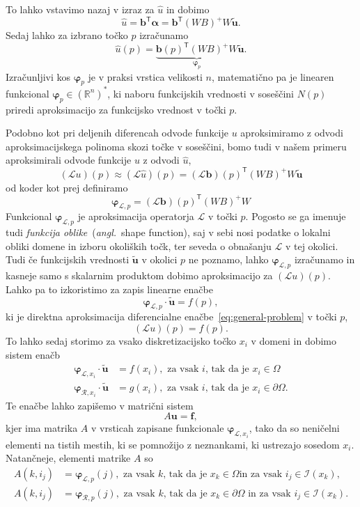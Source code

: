 \documentclass[12pt,a4paper]{article}
\theoremstyle{definition} %
\theoremstyle{plain} %
\numberwithin{equation}{section}
\newcommand{\R}{\mathbb R}
\newcommand{\Rc}{\mathcal{R}}
\newcommand{\I}{\mathcal{I}}
\renewcommand{\L}{\mathcal{L}}
\newcommand{\T}{\mathsf{T}}
\renewcommand{\b}{\boldsymbol}
\renewcommand{\phi}{\varphi}
\newcommand{\uh}{\hat{u}}
\newcommand{\ang}[1]{(\textit{angl.}\ #1)}
\begin{document}
To lahko vstavimo nazaj v izraz za $\hat{u}$ in dobimo
\[
  \hat{u} = \b{b}^\T\b{\alpha} = \b{b}^\T(WB)^{+}W\b{\tilde{u}}.
\]
Sedaj lahko za izbrano točko $p$ izračunamo
\[
  \hat{u}(p) = \underbrace{\b{b}(p)^\T(WB)^{+}W}_{\b\phi_p}\b{\tilde{u}}.
\]
Izračunljivi kos $\b\phi_p$ je v praksi vrstica velikosti $n$, matematično pa je
linearen funkcional $\b\phi_p \in (\R^n)^\ast$, ki naboru funkcijskih vrednosti v
soseščini $N(p)$ priredi aproksimacijo za funkcijsko vrednost v točki $p$.

Podobno kot pri deljenih diferencah odvode funkcije $u$ aproksimiramo z odvodi
aproksimacijskega polinoma skozi točke v soseščini, bomo tudi v našem primeru
aproksimirali odvode funkcije $u$ z odvodi $\uh$,
\[
  (\L u)(p) \approx (\L \uh)(p) = (\L\b{b})(p)^\T(WB)^{+}W \b{\tilde{u}}
\]
od koder kot prej definiramo
\begin{equation}
  \b\phi_{\L,p} = (\L\b{b})(p)^\T(WB)^{+}W
  \label{eq:shape-definition}
\end{equation}
Funkcional $\b\phi_{\L,p}$ je aproksimacija operatorja $\L$ v točki $p$.
Pogosto se ga imenuje tudi \emph{funkcija oblike}~\ang{shape function}, saj v
sebi nosi podatke o lokalni obliki domene in izboru okoliških točk, ter seveda o
obnašanju $\L$ v tej okolici. Tudi če funkcijskih vrednosti $\b{\tilde{u}}$ v
okolici $p$ ne poznamo, lahko $\b\phi_{\L, p}$ izračunamo in kasneje samo s
skalarnim produktom dobimo aproksimacijo za $(\L u)(p)$. Lahko pa to izkoristimo
za zapis linearne enačbe
\[
  \b\phi_{\L,p} \cdot \b{\tilde{u}} = f(p),
\]
ki je direktna aproksimacija diferencialne enačbe~\eqref{eq:general-problem} v točki
$p$,
\[
  (\L u)(p) = f(p).
\]
To lahko sedaj storimo za vsako diskretizacijsko točko $x_i$ v domeni in
dobimo sistem enačb
\begin{align*}
  \b\phi_{\L,x_i} \cdot \b{\tilde{u}} &= f(x_i), \text{ za vsak $i$, tak da je $x_i \in \Omega$ } \\
  \b\phi_{\Rc,x_i} \cdot \b{\tilde{u}} &= g(x_i), \text{ za vsak $i$, tak da je $x_i \in \partial\Omega$.}
\end{align*}
Te enačbe lahko zapišemo v matrični sistem
\begin{equation}
  A\b{u} = \b{f},
  \label{eq:discretized-system}
\end{equation}
kjer ima matrika $A$ v vrsticah zapisane funkcionale $\b\phi_{\L,x_i}$, tako da so
neničelni elementi na tistih mestih, ki se pomnožijo z neznankami, ki ustrezajo
sosedom $x_i$. Natančneje, elementi matrike $A$ so
\begin{align*}
  A(k, i_j) &= \b\phi_{\L,p}(j), \text{ za vsak $k$, tak da je $x_k \in \Omega$
  in za vsak $i_j \in \I(x_k)$,} \\
  A(k, i_j) &= \b\phi_{\Rc,p}(j), \text{ za vsak $k$, tak da je $x_k \in
  \partial\Omega$ in za vsak $i_j \in \I(x_k)$.}
\end{align*}
\end{document}
